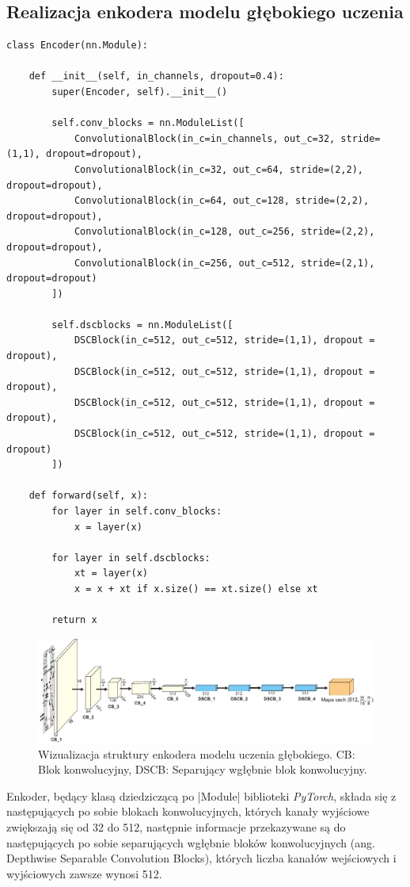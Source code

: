 \subsection{Realizacja enkodera modelu głębokiego uczenia} \label{Encoder}
\begin{lstlisting}[caption={\pyth|Encoder| - klasa enkodera modelu głębokiego uczenia}, label={encoder}]
class Encoder(nn.Module):
	
	def __init__(self, in_channels, dropout=0.4):
		super(Encoder, self).__init__()
	
		self.conv_blocks = nn.ModuleList([
			ConvolutionalBlock(in_c=in_channels, out_c=32, stride=(1,1), dropout=dropout),
			ConvolutionalBlock(in_c=32, out_c=64, stride=(2,2), dropout=dropout),
			ConvolutionalBlock(in_c=64, out_c=128, stride=(2,2), dropout=dropout),
			ConvolutionalBlock(in_c=128, out_c=256, stride=(2,2), dropout=dropout),
			ConvolutionalBlock(in_c=256, out_c=512, stride=(2,1), dropout=dropout)
		])
		
		self.dscblocks = nn.ModuleList([
			DSCBlock(in_c=512, out_c=512, stride=(1,1), dropout = dropout),
			DSCBlock(in_c=512, out_c=512, stride=(1,1), dropout = dropout),
			DSCBlock(in_c=512, out_c=512, stride=(1,1), dropout = dropout),
			DSCBlock(in_c=512, out_c=512, stride=(1,1), dropout = dropout)
		])
	
	def forward(self, x):
		for layer in self.conv_blocks:
			x = layer(x)
	
		for layer in self.dscblocks:
			xt = layer(x)
			x = x + xt if x.size() == xt.size() else xt
	
		return x
\end{lstlisting}

\begin{figure}[h]
	\centering
	\includegraphics[width=15cm]{images/Encoder_illst.pdf}
	\caption{Wizualizacja struktury enkodera modelu uczenia głębokiego. CB: Blok konwolucyjny, DSCB: Separujący wgłębnie blok konwolucyjny.}
	\label{fig:encoder-model-vis}
\end{figure}

Enkoder, będący klasą dziedziczącą po \pyth|Module| biblioteki \textit{PyTorch}, składa się z następujących po sobie blokach konwolucyjnych, których kanały wyjściowe zwiększają się od 32 do 512, następnie informacje przekazywane są do następujących po sobie separujących wgłębnie bloków konwolucyjnych (ang. Depthwise Separable Convolution Blocks), których liczba kanałów wejściowych i wyjściowych zawsze wynosi 512.

